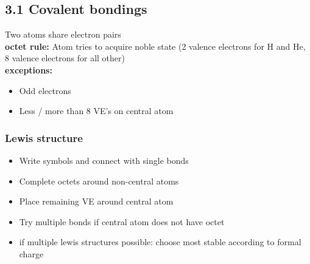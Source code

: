 \subsection{3.1 Covalent bondings}
    Two atoms share electron pairs\\
    \textbf{octet rule:} Atom tries to acquire noble state (2 valence electrons for H and He, 8 valence electrons for all other)\\
    \textbf{exceptions:} 
    \begin{itemize}
        \itemsep0em
        \item Odd electrons
        \item Less / more than 8 VE's on central atom
    \end{itemize}
\subsubsection{Lewis structure}
    \begin{itemize}
        \itemsep0em
        \item Write symbols and connect with single bonds
        \item Complete octets around non-central atoms
        \item Place remaining VE around central atom
        \item Try multiple bonds if central atom does not have octet
        \item if multiple lewis structures possible: choose most stable according to formal charge
    \end{itemize}